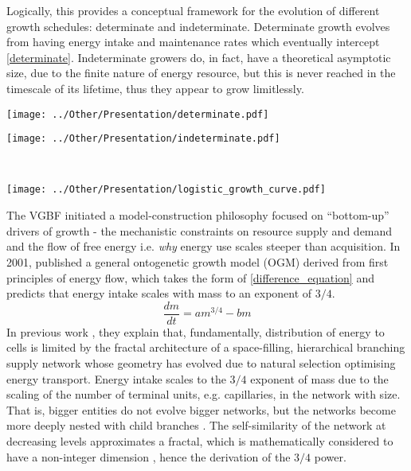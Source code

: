 \documentclass[a4paper]{article} %
\begin{document}
        Logically, this provides a conceptual framework for the evolution of different growth schedules: determinate and indeterminate. Determinate growth evolves from having energy intake and maintenance rates which eventually intercept \ref{determinate}. Indeterminate growers do, in fact, have a theoretical asymptotic size, due to the finite nature of energy resource, but this is never reached in the timescale of its lifetime, thus they appear to grow limitlessly.
    
        \begin{center}
            \begin{minipage}{0.33\linewidth}
            \texttt{[image: ../Other/Presentation/determinate.pdf]}
            \label{determinate}
            \end{minipage}%
            \begin{minipage}{0.33\linewidth}
            \texttt{[image: ../Other/Presentation/indeterminate.pdf]}  
            \label{indeterminate}
            \end{minipage}\\
            \begin{minipage}{0.7\linewidth}
                \texttt{[image: ../Other/Presentation/logistic\_growth\_curve.pdf]}  
                \label{logistic_growth}
                \end{minipage}
        \end{center}
        The VGBF initiated a model-construction philosophy focused on ``bottom-up'' drivers of growth - the mechanistic constraints on resource supply and demand and the flow of free energy i.e. \textit{why} energy use scales steeper than acquisition. In 2001, \cite{West2001} published a general ontogenetic growth model (OGM) derived from first principles of energy flow, which takes the form of \eqref{difference_equation} and predicts that energy intake scales with mass to an exponent of $3/4$.  
        \begin{equation}
            \frac{dm}{dt} = am^{3/4} - bm \label{west_ogm}
        \end{equation}
        In previous work \autocite{West1997, West2005}, they explain that, fundamentally, distribution of energy to cells is limited by the fractal architecture of a space-filling, hierarchical branching supply network whose geometry has evolved due to natural selection optimising energy transport. Energy intake scales to the $3/4$ exponent of mass due to the scaling of the number of terminal units, e.g. capillaries, in the network with size. That is, bigger entities do not evolve bigger networks, but the networks become more deeply nested with child branches \autocite{West1997}. The self-similarity of the network at decreasing levels approximates a fractal, which is mathematically considered to have a non-integer dimension \autocite{Hausdorff1918, Mandelbrot1982}, hence the derivation of the $3/4$ power. 
        
\end{document}
